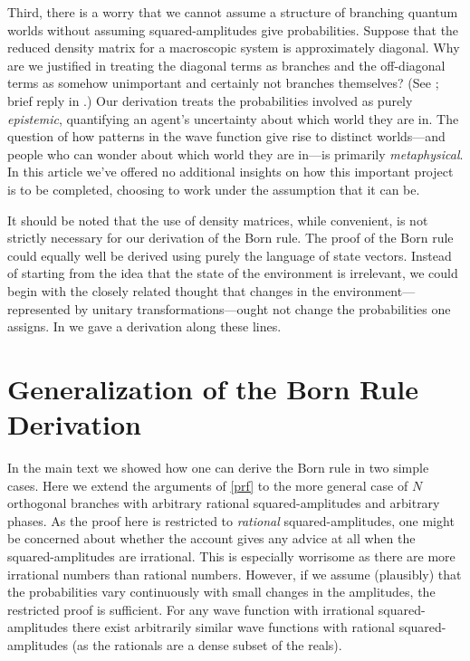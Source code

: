 \documentclass[12pt,onecolumn,secnumarabic,amsmath,amssymb,balancelastpage,nofootinbib]{article}
\begin{document}
Third, there is a worry that we cannot assume a structure of branching quantum worlds without assuming squared-amplitudes give probabilities.  Suppose that the reduced density matrix for a macroscopic system is approximately diagonal.  Why are we justified in treating the diagonal terms as branches and the off-diagonal terms as somehow unimportant and certainly not branches themselves?  (See \citealp{baker2007}; brief reply in \citealp[pp. 243-254]{wallace2012}.)  Our derivation treats the probabilities involved as purely \emph{epistemic}, quantifying an agent's uncertainty about which world they are in.  The question of how patterns in the wave function give rise to distinct worlds---and people who can wonder about which world they are in---is primarily \emph{metaphysical}.  In this article we've offered no additional insights on how this important project is to be completed, choosing to work under the assumption that it can be.

It should be noted that the use of density matrices, while convenient, is not strictly necessary for our derivation of the Born rule.  The proof of the Born rule could equally well be derived using purely the language of state vectors.  Instead of starting from the idea that the state of the environment is irrelevant, we could begin with the closely related thought that changes in the environment---represented by unitary transformations---ought not change the probabilities one assigns. In \citet{carroll2013} we gave a derivation along these lines.

\section{Generalization of the Born Rule Derivation}\label{generalization}

In the main text we showed how one can derive the Born rule in two simple cases.  Here we extend the arguments of \textsection \ref{prf} to the more general case of $N$ orthogonal branches with arbitrary rational squared-amplitudes and arbitrary phases.  As the proof here is restricted to \emph{rational} squared-amplitudes, one might be concerned about whether the account gives any advice at all when the squared-amplitudes are irrational.  This is especially worrisome as there are more irrational numbers than rational numbers.  However, if we assume (plausibly) that the probabilities vary continuously with small changes in the amplitudes, the restricted proof is sufficient. For any wave function with irrational squared-amplitudes there exist arbitrarily similar wave functions with rational squared-amplitudes (as the rationals are a dense subset of the reals).
\end{document}
